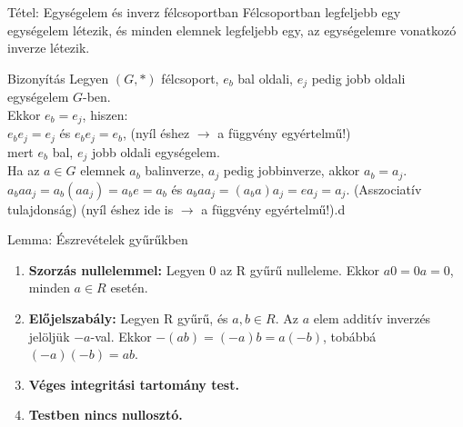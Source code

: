 \documentclass{beamer}
\begin{document}
\begin{frame}[plain]
\end{frame}

\begin{frame}

\begin{block}{Tétel: Egységelem és inverz félcsoportban}
Félcsoportban legfeljebb egy egységelem létezik, és minden elemnek legfeljebb egy, az egységelemre vonatkozó inverze létezik.
\end{block}

\begin{block}{Bizonyítás}
Legyen $(G, *)$ félcsoport, $e_b$ bal oldali, $e_j$ pedig jobb oldali egységelem $G$-ben.\\
Ekkor $e_b = e_j$, hiszen:\\
$e_be_j = e_j$ és $e_be_j = e_b$, (nyíl éshez $\rightarrow$ a függvény egyértelmű!)\\
mert $e_b$ bal, $e_j$ jobb oldali egységelem.\\
Ha az $a \in G$ elemnek $a_b$ balinverze, $a_j$ pedig jobbinverze, akkor $a_b = a_j$.
$a_baa_j = a_b(aa_j) = a_be = a_b$ és $a_baa_j = (a_ba)a_j = ea_j = a_j$. (Asszociatív tulajdonság) (nyíl éshez ide is $\rightarrow$ a függvény egyértelmű!).d
\end{block}

\end{frame}

\begin{frame}

\begin{block}{Lemma: Észrevételek gyűrűkben}
\begin{enumerate}
\item \textbf{Szorzás nullelemmel:} Legyen 0 az R gyűrű nulleleme. Ekkor $a0 = 0a = 0$, minden $a \in R$ esetén.
\item \textbf{Előjelszabály:} Legyen R gyűrű, és $a, b \in R$. Az $a$ elem additív inverzés jelöljük $-a$-val. Ekkor $-(ab) = (-a)b = a(-b)$, tobábbá $(-a)(-b) = ab$.
\item \textbf{Véges integritási tartomány test.}
\item \textbf{Testben nincs nullosztó.}
\end{enumerate}
\end{block}

\end{frame}
\end{document}
